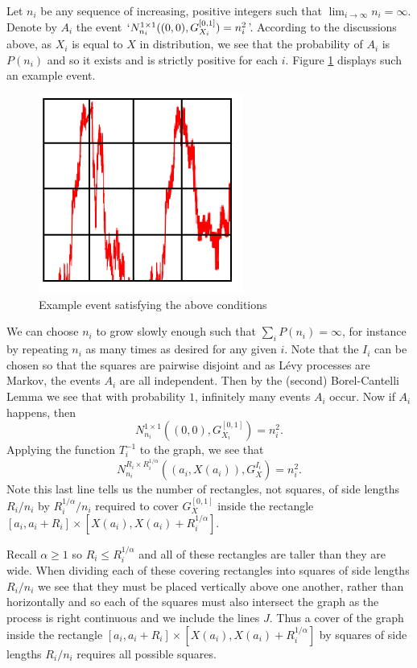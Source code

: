 Let $n_i$ be any sequence of increasing, positive integers such that $\lim_{i\to\infty} n_i=\infty$. Denote by $A_i$ the event $`N_{n_i}^{1 \times 1 }((0,0),G_{X_i}^{[0,1]})=n_i^2 $'. According to the discussions above, as $X_i$ is equal to $X$ in distribution, we see that the probability of $A_i$ is $P(n_i)$ and so it exists and is strictly positive for each $i$. Figure \ref{fig:example-rectangle1} displays such an example event. 

\begin{figure}[h]\label{fig:example-rectangle1}
    \centering
    \includegraphics[width=0.6\textwidth]{pics/ch-brownian/event-rectangles.png}
    \caption{Example event satisfying the above conditions}
    \label{fig:example-rectangle1}
\end{figure}

We can choose $n_i$ to grow slowly enough such that $\sum_{i}P(n_i)=\infty$, for instance by repeating $n_i$ as many times as desired for any given $i$. Note that the $I_i$ can be chosen so that the squares are pairwise disjoint and as L\'evy processes are Markov, the events $A_i$ are all independent. Then by the (second) Borel-Cantelli Lemma we see that with probability $1$, infinitely many events $A_i$ occur. Now if $A_i$ happens, then
\[
N_{n_i}^{1 \times 1 }\left((0,0),G_{X_i}^{[0,1]}\right)=n_i^2.
\]
Applying the function $T^{-1}_i$ to the graph, we see that
\[
N_{n_i}^{R_i \times R_i^{1/\alpha} }\left((a_i,X(a_i)),G_{X}^{I_i}\right)=n_i^2.
\]
Note this last line tells us the number of rectangles, not squares, of side lengths $R_i / n_i$ by $R_i^{1/\alpha} / n_i$ required to cover $G_X^{[0,1]}$ inside the rectangle $[a_i, a_i + R_i] \times [X(a_i), X(a_i) + R_i^{1/\alpha}]$. 

Recall $\alpha \ge 1$ so $R_i\leq R_i^{1/\alpha}$ and all of these rectangles are taller than they are wide. When dividing each of these covering rectangles into squares of side lengths $R_i / n_i$ we see that they must be placed vertically above one another, rather than horizontally and so each of the squares must also intersect the graph as the process is right continuous and we include the lines $J$. Thus a cover of the graph inside the rectangle $[a_i, a_i + R_i] \times [X(a_i), X(a_i) + R_i^{1/\alpha}]$ by squares of side lengths $R_i / n_i$ requires all possible squares.

